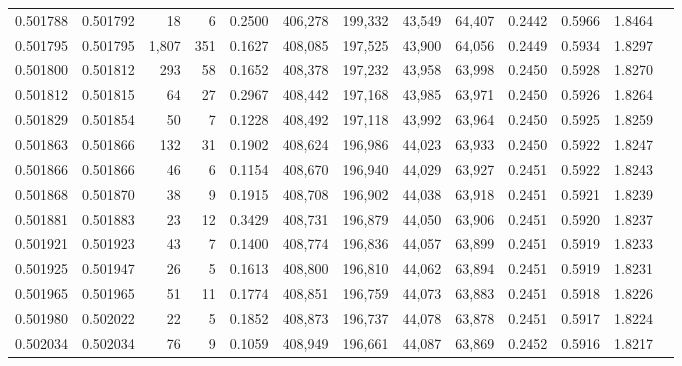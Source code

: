 \begin{tabular}{rrrrrrrrrrrrr}
0.501788 & 0.501792 &    18 &     6 &                                     0.2500 & 406,278 & 199,332 &  43,549 &  64,407 & 0.2442 & 0.5966 & 1.8464 \\
0.501795 & 0.501795 & 1,807 &   351 &                                     0.1627 & 408,085 & 197,525 &  43,900 &  64,056 & 0.2449 & 0.5934 & 1.8297 \\
0.501800 & 0.501812 &   293 &    58 &                                     0.1652 & 408,378 & 197,232 &  43,958 &  63,998 & 0.2450 & 0.5928 & 1.8270 \\
0.501812 & 0.501815 &    64 &    27 &                                     0.2967 & 408,442 & 197,168 &  43,985 &  63,971 & 0.2450 & 0.5926 & 1.8264 \\
0.501829 & 0.501854 &    50 &     7 &                                     0.1228 & 408,492 & 197,118 &  43,992 &  63,964 & 0.2450 & 0.5925 & 1.8259 \\
0.501863 & 0.501866 &   132 &    31 &                                     0.1902 & 408,624 & 196,986 &  44,023 &  63,933 & 0.2450 & 0.5922 & 1.8247 \\
0.501866 & 0.501866 &    46 &     6 &                                     0.1154 & 408,670 & 196,940 &  44,029 &  63,927 & 0.2451 & 0.5922 & 1.8243 \\
0.501868 & 0.501870 &    38 &     9 &                                     0.1915 & 408,708 & 196,902 &  44,038 &  63,918 & 0.2451 & 0.5921 & 1.8239 \\
0.501881 & 0.501883 &    23 &    12 &                                     0.3429 & 408,731 & 196,879 &  44,050 &  63,906 & 0.2451 & 0.5920 & 1.8237 \\
0.501921 & 0.501923 &    43 &     7 &                                     0.1400 & 408,774 & 196,836 &  44,057 &  63,899 & 0.2451 & 0.5919 & 1.8233 \\
0.501925 & 0.501947 &    26 &     5 &                                     0.1613 & 408,800 & 196,810 &  44,062 &  63,894 & 0.2451 & 0.5919 & 1.8231 \\
0.501965 & 0.501965 &    51 &    11 &                                     0.1774 & 408,851 & 196,759 &  44,073 &  63,883 & 0.2451 & 0.5918 & 1.8226 \\
0.501980 & 0.502022 &    22 &     5 &                                     0.1852 & 408,873 & 196,737 &  44,078 &  63,878 & 0.2451 & 0.5917 & 1.8224 \\
0.502034 & 0.502034 &    76 &     9 &                                     0.1059 & 408,949 & 196,661 &  44,087 &  63,869 & 0.2452 & 0.5916 & 1.8217 \\

\end{tabular}
